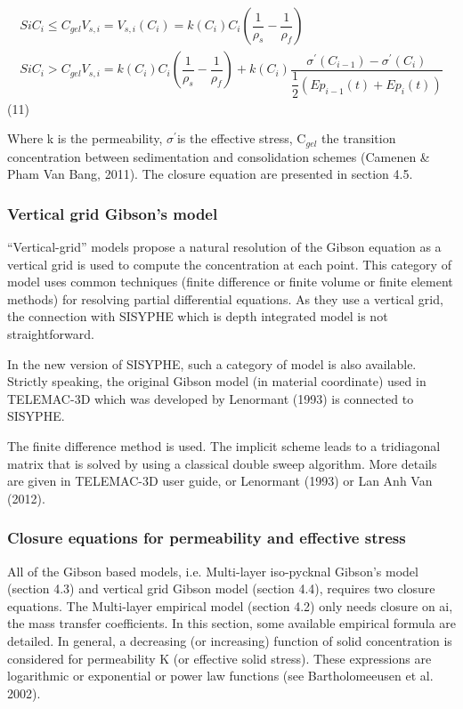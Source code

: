 \begin{gather*}
SiC_{i} \leq C_{gel} V_{s,i} =V_{s,i} (C_{i} )=k(C_{i} )C_{i} \left( \dfrac{1%
}{\rho _{s} } -\dfrac{1}{\rho _{f} } \right) \\
SiC_{i} >C_{gel} V_{s,i} =k(C_{i} )C_{i} \left( \dfrac{1}{\rho _{s} } -%
\dfrac{1}{\rho _{f} } \right) +k(C_{i} )\dfrac{\sigma ^{\prime }(C_{i-1}
)-\sigma ^{\prime }(C_{i} )}{\dfrac{1}{2} (Ep_{i-1} (t)+Ep_{i} (t))}
\end{gather*}
\hspace{5mm} (11)

Where k is the permeability, $\sigma ^{\prime }$is the effective stress, C$%
_{gel}$ the transition concentration between sedimentation and consolidation
schemes (Camenen \& Pham Van Bang, 2011). The closure equation are presented
in section 4.5.

\subsubsection{Vertical grid Gibson's model}

``Vertical-grid'' models propose a natural resolution of the Gibson equation
as a vertical grid is used to compute the concentration at each point. This
category of model uses common techniques (finite difference or finite volume
or finite element methods) for resolving partial differential equations.%
\newline
As they use a vertical grid, the connection with SISYPHE which is depth
integrated model is not straightforward.

In the new version of SISYPHE, such a category of model is also available.
Strictly speaking, the original Gibson model (in material coordinate) used
in TELEMAC-3D which was developed by Lenormant (1993) is connected to
SISYPHE.

The finite difference method is used. The implicit scheme leads to a
tridiagonal matrix that is solved by using a classical double sweep
algorithm. More details are given in TELEMAC-3D user guide, or Lenormant
(1993) or Lan Anh Van (2012).

\subsubsection{Closure equations for permeability and effective stress}

All of the Gibson based models, i.e. Multi-layer iso-pycknal Gibson's model
(section 4.3) and vertical grid Gibson model (section 4.4), requires two
closure equations. The Multi-layer empirical model (section 4.2) only needs
closure on ai, the mass transfer coefficients.\newline
In this section, some available empirical formula are detailed. In general,
a decreasing (or increasing) function of solid concentration is considered
for permeability K (or effective solid stress). These expressions are
logarithmic or exponential or power law functions (see Bartholomeeusen et
al. 2002).

